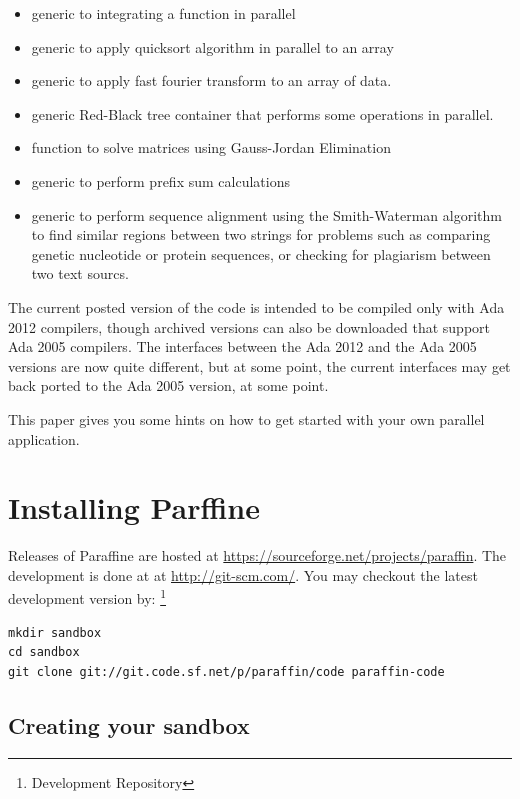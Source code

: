 \documentclass[justified]{tufte-book}
\numberwithin{equation}{subsection}
\begin{document}
\begin{itemize}
   \item generic to integrating a function in parallel
   \item generic to apply quicksort algorithm in parallel to an array
   \item generic to apply fast fourier transform to an array of data.
   \item generic Red-Black tree container that performs some operations
      in parallel.
   \item function to solve matrices using Gauss-Jordan Elimination
   \item generic to perform prefix sum calculations
   \item generic to perform sequence alignment using the Smith-Waterman
      algorithm to find similar regions between two strings for
      problems such as comparing genetic nucleotide or protein sequences,
      or checking for plagiarism between two text sourcs.
\end{itemize}

The current posted version of the code is intended to be compiled
only with Ada 2012 compilers, though archived versions can also be
downloaded that support Ada 2005 compilers. The interfaces between
the Ada 2012 and the Ada 2005 versions are now quite different,
but at some point, the current interfaces may get back ported to
the Ada 2005 version, at some point.

This paper gives you some hints on how to get started with your own parallel
application.

\chapter{Installing Parffine}\label{ch:installing}

Releases of Paraffine are hosted at 
\url{https://sourceforge.net/projects/paraffin}. The development is done at 
at \url{http://git-scm.com/}. You may checkout the 
latest development version by:
\footnote{Development Repository}
\begin{verbatim}
mkdir sandbox
cd sandbox
git clone git://git.code.sf.net/p/paraffin/code paraffin-code
\end{verbatim}

\section{Creating your sandbox}\label{sec:sandboc}
\end{document}
